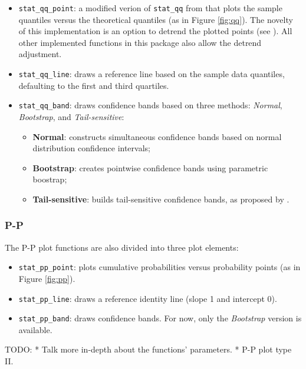 \begin{itemize}
\item
  \texttt{stat\_qq\_point}: a modified verion of \texttt{stat\_qq} from
   that plots the sample quantiles versus the theoretical
  quantiles (as in Figure \ref{fig:qq}). The novelty of this
  implementation is an option to detrend the plotted points (see
  ). All other implemented functions in this
  package also allow the detrend adjustment.
\item
  \texttt{stat\_qq\_line}: draws a reference line based on the sample
  data quantiles, defaulting to the first and third quartiles.
\item
  \texttt{stat\_qq\_band}: draws confidence bands based on three
  methods: \emph{Normal}, \emph{Bootstrap}, and \emph{Tail-sensitive}:

  \begin{itemize}
  \tightlist
  \item
    \textbf{Normal}: constructs simultaneous confidence bands based on
    normal distribution confidence intervals;
  \item
    \textbf{Bootstrap}: creates pointwise confidence bands using
    parametric boostrap;
  \item
    \textbf{Tail-sensitive}: builds tail-sensitive confidence bands, as
    proposed by \citet{Aldor-Noiman2013-xw}.
  \end{itemize}
\end{itemize}

\subsubsection{P-P}\label{p-p}

The P-P plot functions are also divided into three plot elements:

\begin{itemize}
\item
  \texttt{stat\_pp\_point}: plots cumulative probabilities versus
  probability points (as in Figure \ref{fig:pp}).
\item
  \texttt{stat\_pp\_line}: draws a reference identity line (slope 1 and
  intercept 0).
\item
  \texttt{stat\_pp\_band}: draws confidence bands. For now, only the
  \emph{Bootstrap} version is available.
\end{itemize}

TODO: * Talk more in-depth about the functions' parameters. * P-P plot
type II.

